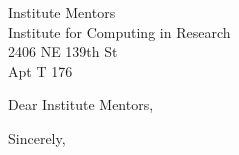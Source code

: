 \documentclass[10pt,letter]{letter}
\def\hm{Institute Mentors} %
\begin{document}
\begin{letter}{\hm \\ Institute for Computing in Research \\ 2406 NE 139th St \\ Apt T 176  }

\opening{Dear \hm,}

\setlength\parindent{.5in}



 

\closing{Sincerely,}
\end{letter}
\end{document}
